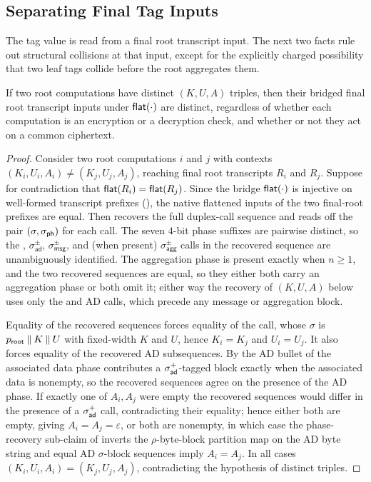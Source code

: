 \subsection{Separating Final Tag Inputs}

The tag value is read from a final root transcript input. The next two facts
rule out structural collisions at that input, except for the explicitly charged
possibility that two leaf tags collide before the root aggregates them.

\begin{proposition}
\label{cor:triple-sep}
If two \TW{} root computations have distinct $(K, U, A)$ triples, then
their bridged final root transcript inputs under $\mathsf{flat}(\cdot)$ are
distinct, regardless of whether each computation is an encryption or
a decryption check, and whether or not they act on a common ciphertext.
\end{proposition}

\begin{proof}
Consider two root computations $i$ and $j$ with contexts
$(K_i, U_i, A_i) \neq (K_j, U_j, A_j)$, reaching final root transcripts
$R_i$ and $R_j$. Suppose for contradiction that
$\mathsf{flat}(R_i) = \mathsf{flat}(R_j)$. Since the
bridge $\mathsf{flat}(\cdot)$ is injective on well-formed transcript prefixes
(), the native flattened inputs of the two
final-root prefixes are equal. Then 
recovers the full duplex-call sequence and reads off the pair
$(\sigma,\sigph)$ for each call. The seven $4$-bit phase suffixes are
pairwise distinct, so the \siginit, $\sigma_{\mathsf{ad}}^\pm$,
$\sigma_{\mathsf{msg}}^\pm$, and (when present) $\sigma_{\mathsf{agg}}^\pm$
calls in the recovered sequence are unambiguously identified. The
aggregation phase is present exactly when $n \geq 1$, and the two
recovered sequences are equal, so they either both carry an aggregation
phase or both omit it; either way the recovery of $(K, U, A)$ below uses only the
\siginit and AD calls, which precede any message or aggregation block.

Equality of the recovered sequences forces equality of the \siginit
call, whose $\sigma$ is $p_{\mathsf{root}} \mathbin{\|} K \mathbin{\|} U$ with
fixed-width $K$ and $U$, hence $K_i = K_j$ and $U_i = U_j$. It also
forces equality of the recovered AD subsequences. By the AD bullet of
 the associated data phase contributes a
$\sigma_{\mathsf{ad}}^+$-tagged block exactly when the associated data is nonempty,
so the recovered sequences agree on the presence of the AD phase. If
exactly one of $A_i, A_j$ were empty the recovered sequences would
differ in the presence of a $\sigma_{\mathsf{ad}}^+$ call, contradicting their
equality; hence either both are empty, giving $A_i = A_j = \varepsilon$,
or both are nonempty, in which case the phase-recovery sub-claim of
 inverts the $\rho$-byte-block partition map on
the AD byte string and equal AD $\sigma$-block sequences imply
$A_i = A_j$. In all cases $(K_i, U_i, A_i) = (K_j, U_j, A_j)$,
contradicting the hypothesis of distinct triples.
\end{proof}

